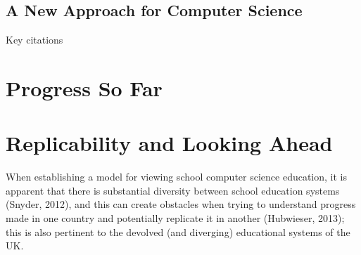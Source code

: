 \documentclass[sigconf]{acmart}
\begin{document}
\subsection{A New Approach for Computer Science}

Key citations~\cite{crick+moller:wipsce2015,moller+crick:jce2018}

\section{Progress So Far}

\section{Replicability and Looking Ahead}

When establishing a model for viewing school computer science
education, it is apparent that there is substantial diversity between
school education systems (Snyder, 2012), and this can create obstacles
when trying to understand progress made in one country and potentially
replicate it in another (Hubwieser, 2013); this is also pertinent to
the devolved (and diverging) educational systems of the UK.








 
\end{document}
